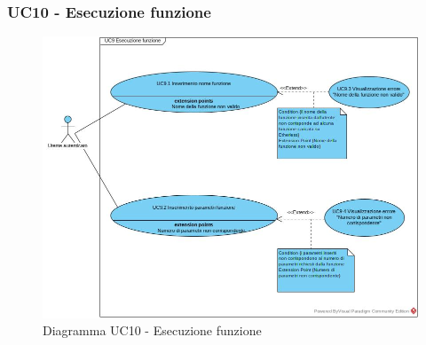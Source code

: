 \subsubsection{UC10 - Esecuzione funzione}
\begin{figure}[h]
	\centering
	\includegraphics[width=\linewidth]{res/img/UC9.jpg}
	\caption{Diagramma UC10 - Esecuzione funzione}
\end{figure}
